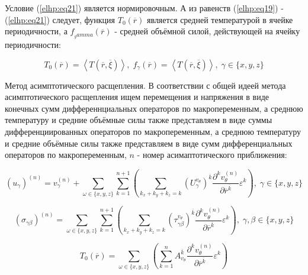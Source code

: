 Условие 
(\ref{elhp:eq21})
является нормировочным. А из равенств 
(\ref{elhp:eq19})
-
(\ref{elhp:eq21})
следует, функция 
$T_0 \left(  \overline{r} \right) $ 
является средней температурой в 
ячейке периодичности, а 
$f_{_gamma} \left( \overline{r}  \right) $
- средней объёмной силой, действующей на ячейку периодичности: 

\begin{equation}
    \label{elhp:eq22}
    T_0 \left( \overline{r}  \right) = \left< T \left( \overline{r} , \overline{\xi}  \right)  \right> 
    ,\;
    f_{\gamma} \left( \overline{r}  \right) = \left< T \left( \overline{r} , \overline{\xi}  \right)  \right> 
    ,\;
    \gamma \in \{x,y,z\} 
\end{equation}

Метод асимптотического расщепления. В соответствии с общей идеей метода асимптотического расщепления ищем перемещения и напряжения в виде
конечных сумм дифференнциальных операторов по макропеременным, а среднюю температуру и средние объёмные силы также представляем в виде суммы 
дифференциированных операторов по макропеременным, а среднюю температуру и средние объёмные силы также представляем в виде сумм дифференциальных 
операторов по макропеременным, 
$n$
- номер асимаптотического приближения:

\begin{equation}
    \label{elhp:eq23}
    \left( u_{\gamma} \right)^{(n)} =
    v_{\gamma}^{(n)} +
    \sum_{ \omega \in \{x,y,z\} } \sum_{k=1}^{n+1}
    \left( 
    \sum_{k_x+k_y+k_z = k} 
    \left( U_{\gamma}^{v_{\theta}} \right)^{ \overline{k} } 
    \frac{\partial^k v_{\theta}^{(n)}}{\partial \overline{r}^{ \overline{k}  } } 
    \varepsilon^k
\right) 
,\;
\gamma \in \{x,y,z\} 
\end{equation}

\begin{equation}
    \label{elhp:eq24}
    \left( \sigma_{\gamma\beta} \right)^{(n)} =
    \sum_{ \omega \in \{x,y,z\} } \sum_{k=1}^{n+1}
    \left( 
    \sum_{k_x+k_y+k_z = k} 
    \left( \tau_{ \gamma\beta}^{v_{\theta}} \right)^{ \overline{k} }
    \frac{\partial^k v_{\theta}^{(n)}}{\partial \overline{r}^{ \overline{k}  } } 
    \varepsilon^k
    \right) 
,\;
    \gamma,\beta \in \{x,y,z\} 
\end{equation}

\begin{equation}
    \label{elhp:eq25}
    T_0 \left( \overline{r}  \right) =
    \sum_{ \omega \in \{x,y,z\} } 
    \left( 
        \sum_{k=1}^{n}
        A_{v_{\theta}}^{ \overline{k} }
        \frac{\partial^k v_{\theta}^{(n)}}{\partial \overline{r}^{ \overline{k}  } } 
        \varepsilon^k
    \right) 
\end{equation}

